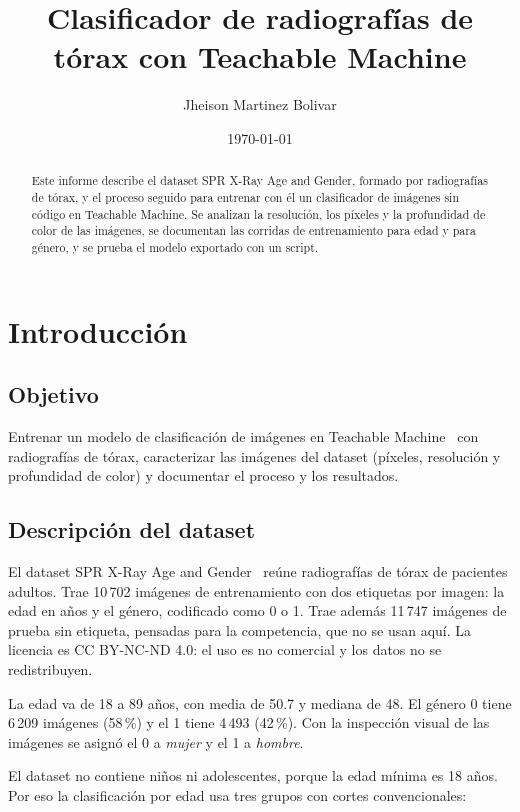 \documentclass[a4paper,11pt]{article}
\title{Clasificador de radiografías de tórax con Teachable Machine}
\author{Jheison Martinez Bolivar}
\date{\today}
\begin{document}
  \maketitle

  \begin{abstract}
    Este informe describe el dataset SPR X-Ray Age and Gender, formado por
    radiografías de tórax, y el proceso seguido para entrenar con él un
    clasificador de imágenes sin código en Teachable Machine. Se analizan la
    resolución, los píxeles y la profundidad de color de las imágenes, se
    documentan las corridas de entrenamiento para edad y para género, y se
    prueba el modelo exportado con un script.
  \end{abstract}

  \section{Introducción}
  \subsection{Objetivo}
  Entrenar un modelo de clasificación de imágenes en Teachable
  Machine~\cite{teachable_machine} con radiografías de tórax, caracterizar las
  imágenes del dataset (píxeles, resolución y profundidad de color) y
  documentar el proceso y los resultados.

  \subsection{Descripción del dataset}
  El dataset SPR X-Ray Age and Gender~\cite{kitamura_spr} reúne radiografías de
  tórax de pacientes adultos. Trae 10\,702 imágenes de entrenamiento con dos
  etiquetas por imagen: la edad en años y el género, codificado como 0 o 1. Trae
  además 11\,747 imágenes de prueba sin etiqueta, pensadas para la competencia,
  que no se usan aquí. La licencia es CC BY-NC-ND 4.0: el uso es no comercial y
  los datos no se redistribuyen.

  La edad va de 18 a 89 años, con media de 50.7 y mediana de 48. El género 0 tiene
  6\,209 imágenes (58\,\%) y el 1 tiene 4\,493 (42\,\%). Con la inspección visual
  de las imágenes se asignó el 0 a \textit{mujer} y el 1 a \textit{hombre}.

  El dataset no contiene niños ni adolescentes, porque la edad mínima es 18
  años. Por eso la clasificación por edad usa tres grupos con cortes
  convencionales:
\end{document}
